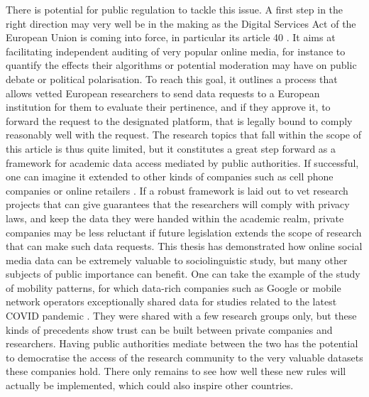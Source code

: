 \documentclass[../thesis.tex]{subfiles}
\begin{document}
There is potential for public regulation to tackle this issue. A first step in the right
direction may very well be in the making as the Digital Services Act of the European
Union is coming into force, in particular its article 40 \cite{DigitalServices2022}. It
aims at facilitating independent auditing of very popular online media, for instance to
quantify the effects their algorithms or potential moderation may have on public debate
or political polarisation. To reach this goal, it outlines a process that allows vetted
European researchers to send data requests to a European institution for them to
evaluate their pertinence, and if they approve it, to forward the request to the
designated platform, that is legally bound to comply reasonably well with the request.
The research topics that fall within the scope of this article is thus quite limited,
but it constitutes a great step forward as a framework for academic data access mediated
by public authorities. If successful, one can imagine it extended to other kinds of
companies such as cell phone companies or online retailers
\cite{PersilyProposalResearcher2021}. If a robust framework is laid out to vet research
projects that can give guarantees that the researchers will comply with privacy laws,
and keep the data they were handed within the academic realm, private companies may be
less reluctant if future legislation extends the scope of research that can make such
data requests. This thesis has demonstrated how online social media data can be
extremely valuable to sociolinguistic study, but many other subjects of public
importance can benefit. One can take the example of the study of mobility patterns, for
which data-rich companies such as Google or mobile network operators exceptionally
shared data for studies related to the latest COVID pandemic
\cite{AguilarImpactUrban2022,GozziEstimatingEffect2021}. They were shared with a few
research groups only, but these kinds of precedents show trust can be built between
private companies and researchers. Having public authorities mediate between the two has
the potential to democratise the access of the research community to the very valuable
datasets these companies hold. There only remains to see how well these new rules will
actually be implemented, which could also inspire other countries.


\end{document}
